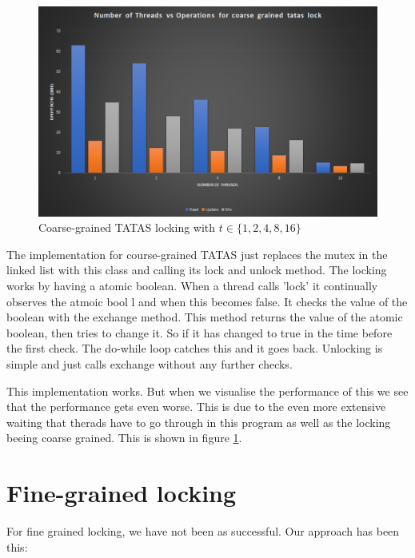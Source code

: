 \begin{figure}
    \centering
    \includegraphics[width=\linewidth]{Figures/coarsegrainedtatas.png}
    \caption{Coarse-grained TATAS locking with $t \in \{1, 2, 4, 8, 16\}$}
    \label{fig:coarsegrainedtatas}
\end{figure}


The implementation for course-grained TATAS just replaces the mutex in the
linked list with this class and calling its lock and unlock method.
The locking works by having a atomic boolean. When a thread calls 'lock'
it continually observes the atmoic bool l and when this becomes false. It checks
the value of the boolean with the exchange method. This method returns the value
of the atomic boolean, then tries to change it. So if it has changed to true
in the time before the first check. The do-while loop catches this and it goes 
back. Unlocking is simple and just calls exchange without any further checks.

This implementation works. But when we visualise the performance of this we see
that the performance gets even worse. This is due to the even more extensive 
waiting that therads have to go through in this program as well as the locking
beeing coarse grained. This is shown in figure \ref{fig:coarsegrainedtatas}.

\section{Fine-grained locking}

For fine grained locking, we have not been as successful. Our approach has been
this:

